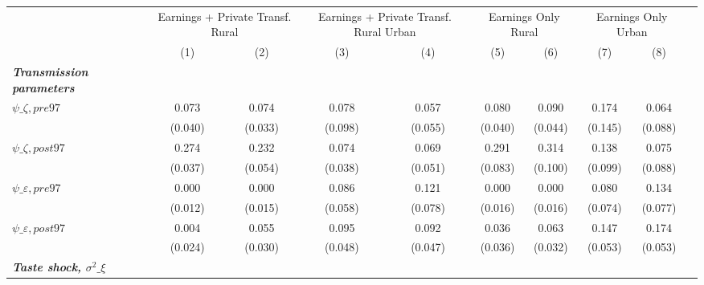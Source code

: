 \begin{tabular}{l*{10}{c}} \toprule
                    &            &\multicolumn{2}{c}{Earnings + Private Transf. Rural}&\multicolumn{2}{c}{Earnings + Private Transf. Rural Urban}&\multicolumn{2}{c}{Earnings Only Rural}&\multicolumn{2}{c}{Earnings Only Urban}\\\cmidrule{3-4}\cmidrule{5-6}\cmidrule{7-8}\cmidrule{9-10}
                    &            &\multicolumn{1}{c}{(1)}&\multicolumn{1}{c}{(2)}&\multicolumn{1}{c}{(3)}&\multicolumn{1}{c}{(4)}&\multicolumn{1}{c}{(5)}&\multicolumn{1}{c}{(6)}&\multicolumn{1}{c}{(7)}&\multicolumn{1}{c}{(8)}\\
\midrule
\textbf{\emph{Transmission parameters}}&            &            &            &            &            &            &            &            &            \\
\hspace{.3cm} $\psi\_{\zeta,pre97}$&            &       0.073&       0.074&       0.078&       0.057&       0.080&       0.090&       0.174&       0.064\\
                    &            &     (0.040)&     (0.033)&     (0.098)&     (0.055)&     (0.040)&     (0.044)&     (0.145)&     (0.088)\\
\hspace{.3cm} $\psi\_{\zeta,post97}$&            &       0.274&       0.232&       0.074&       0.069&       0.291&       0.314&       0.138&       0.075\\
                    &            &     (0.037)&     (0.054)&     (0.038)&     (0.051)&     (0.083)&     (0.100)&     (0.099)&     (0.088)\\
\hspace{.3cm} $\psi\_{\varepsilon,pre97}$&            &       0.000&       0.000&       0.086&       0.121&       0.000&       0.000&       0.080&       0.134\\
                    &            &     (0.012)&     (0.015)&     (0.058)&     (0.078)&     (0.016)&     (0.016)&     (0.074)&     (0.077)\\
\hspace{.3cm} $\psi\_{\varepsilon,post97}$&            &       0.004&       0.055&       0.095&       0.092&       0.036&       0.063&       0.147&       0.174\\
                    &            &     (0.024)&     (0.030)&     (0.048)&     (0.047)&     (0.036)&     (0.032)&     (0.053)&     (0.053)\\
\textbf{\emph{Taste shock, $\sigma^2\_{\xi}$}}&            &            &            &            &            &            &            &            &            \\

\end{tabular}
